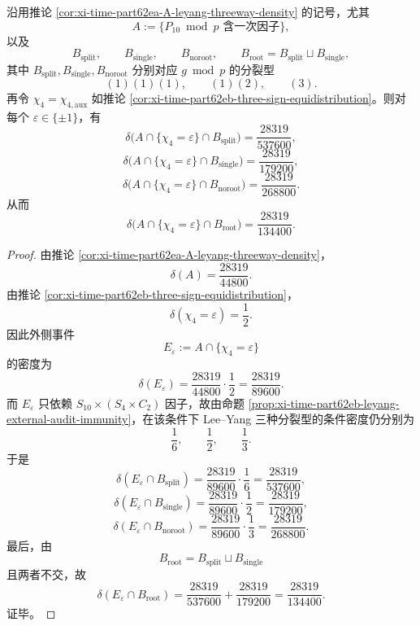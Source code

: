 \begin{theorem}\label{thm:xi-time-part62eb-A-chi4-leyang-six-densities}
沿用推论 \ref{cor:xi-time-part62ea-A-leyang-threeway-density} 的记号，尤其
\[
A:=\{\text{\(P_{10}\bmod p\) 含一次因子}\},
\]
以及
\[
B_{\mathrm{split}},\qquad
B_{\mathrm{single}},\qquad
B_{\mathrm{noroot}},\qquad
B_{\mathrm{root}}=B_{\mathrm{split}}\sqcup B_{\mathrm{single}},
\]
其中 \(B_{\mathrm{split}},B_{\mathrm{single}},B_{\mathrm{noroot}}\) 分别对应 \(g\bmod p\) 的分裂型
\[
(1)(1)(1),\qquad (1)(2),\qquad (3).
\]
再令 \(\chi_4=\chi_{4,\mathrm{aux}}\) 如推论 \ref{cor:xi-time-part62eb-three-sign-equidistribution}。则对每个 \(\varepsilon\in\{\pm1\}\)，有
\[
\delta\!\bigl(A\cap\{\chi_4=\varepsilon\}\cap B_{\mathrm{split}}\bigr)
=
\frac{28319}{537600},
\]
\[
\delta\!\bigl(A\cap\{\chi_4=\varepsilon\}\cap B_{\mathrm{single}}\bigr)
=
\frac{28319}{179200},
\]
\[
\delta\!\bigl(A\cap\{\chi_4=\varepsilon\}\cap B_{\mathrm{noroot}}\bigr)
=
\frac{28319}{268800}.
\]
从而
\[
\delta\!\bigl(A\cap\{\chi_4=\varepsilon\}\cap B_{\mathrm{root}}\bigr)
=
\frac{28319}{134400}.
\]
\end{theorem}
\begin{proof}
由推论 \ref{cor:xi-time-part62ea-A-leyang-threeway-density}，
\[
\delta(A)=\frac{28319}{44800}.
\]
由推论 \ref{cor:xi-time-part62eb-three-sign-equidistribution}，
\[
\delta(\chi_4=\varepsilon)=\frac12.
\]
因此外侧事件
\[
E_\varepsilon:=A\cap\{\chi_4=\varepsilon\}
\]
的密度为
\[
\delta(E_\varepsilon)=\frac{28319}{44800}\cdot \frac12=\frac{28319}{89600}.
\]
而 \(E_\varepsilon\) 只依赖 \(S_{10}\times (S_4\times C_2)\) 因子，故由命题 \ref{prop:xi-time-part62eb-leyang-external-audit-immunity}，在该条件下 Lee--Yang 三种分裂型的条件密度仍分别为
\[
\frac16,\qquad \frac12,\qquad \frac13.
\]
于是
\[
\delta(E_\varepsilon\cap B_{\mathrm{split}})
=
\frac{28319}{89600}\cdot \frac16
=
\frac{28319}{537600},
\]
\[
\delta(E_\varepsilon\cap B_{\mathrm{single}})
=
\frac{28319}{89600}\cdot \frac12
=
\frac{28319}{179200},
\]
\[
\delta(E_\varepsilon\cap B_{\mathrm{noroot}})
=
\frac{28319}{89600}\cdot \frac13
=
\frac{28319}{268800}.
\]
最后，由
\[
B_{\mathrm{root}}=B_{\mathrm{split}}\sqcup B_{\mathrm{single}}
\]
且两者不交，故
\[
\delta(E_\varepsilon\cap B_{\mathrm{root}})
=
\frac{28319}{537600}+\frac{28319}{179200}
=
\frac{28319}{134400}.
\]
证毕。
\end{proof}

